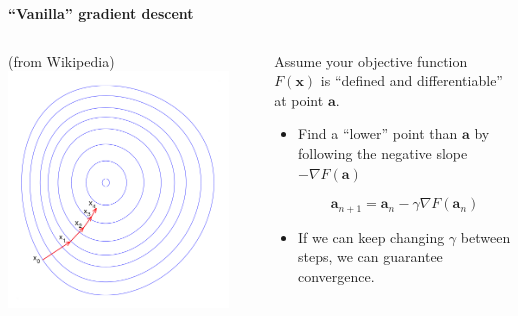 \documentclass{beamer}
\newcommand{\pagestepalt}[2]{
  \begin{frame}[t]
    \begin{minipage}[t][0.26\textheight][t]{\textwidth}
      \begin{center}
        \huge
        \textbf{#1}
      \end{center}
    \end{minipage}
    
    \begin{minipage}[t][0.7\textheight][c]{\textwidth}
      #2
    \end{minipage}
  \end{frame}
}
\begin{document}
\pagestepalt{``Vanilla'' gradient descent}{
  \vspace{-0.2cm}
  \begin{columns}[T]
    \begin{column}{0.49\textwidth}
      \begin{center}
        (from Wikipedia)\\
        \includegraphics[width=0.9\textwidth]{grad0.png}
      \end{center}
    \end{column}
    \begin{column}{0.49\textwidth}
      Assume your objective
      function $F(\mathbf{x})$ is ``defined and differentiable'' at point
      $\mathbf{a}$.\\\pause
      \begin{itemize}
      \item Find a ``lower'' point than $\mathbf{a}$ by following the
        negative slope $-\nabla F(\mathbf{a})$
        \begin{block}{}
          \[\mathbf{a}_{n+1} = \mathbf{a}_n - \gamma \nabla F(\mathbf{a}_n) \]
        \end{block}\pause
      \item If we can keep changing $\gamma$ between steps, we can guarantee
        \alert{convergence}.
      \end{itemize}
    \end{column}
  \end{columns}
}
\end{document}
